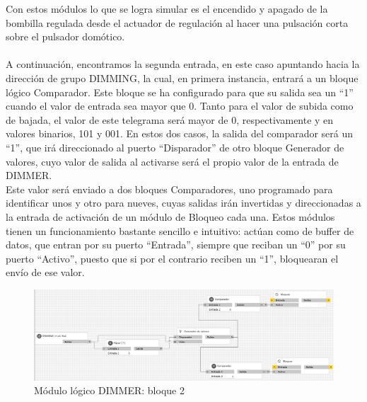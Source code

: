 \begin{itemize}
Con estos módulos lo que se logra simular es el encendido y apagado de la bombilla regulada desde el actuador de regulación al hacer una pulsación corta sobre el pulsador domótico.\\\\
A continuación, encontramos la segunda entrada, en este caso apuntando hacia la dirección de grupo DIMMING, la cual, en primera instancia, entrará a un bloque lógico Comparador. Este bloque se ha configurado para que su salida sea un “1” cuando el valor de entrada sea mayor que 0. Tanto para el valor de subida como de bajada, el valor de este telegrama será mayor de 0, respectivamente y en valores binarios, 101 y 001. En estos dos  casos, la salida del comparador será un “1”, que irá direccionado al puerto “Disparador” de otro bloque Generador de valores, cuyo valor de salida al activarse será el propio valor de la entrada de DIMMER. \\ Este valor será enviado a dos bloques Comparadores, uno programado para identificar unos y otro para nueves, cuyas salidas irán invertidas y direccionadas a la entrada de activación de un módulo de Bloqueo cada una. Estos módulos tienen un funcionamiento bastante sencillo e intuitivo: actúan como de buffer de datos, que entran por su puerto “Entrada”, siempre que reciban un “0” por su puerto “Activo”, puesto que si por el contrario reciben un “1”, bloquearan el envío de ese valor. 
 \begin{center}
\begin{figure}[H]
\includegraphics[width=1.15\textwidth]{figures/log_dimm_b2.png}   
\caption{Módulo lógico DIMMER: bloque 2}
\label{fig:log_dimm_b2}
\end{figure}
\end{center}

\end{itemize}

